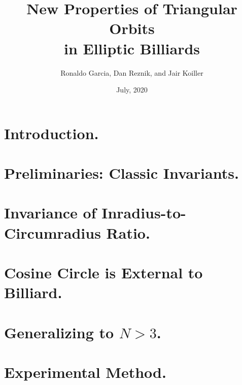\documentclass{article}
\begin{document}
\title{New Properties of Triangular Orbits\\in Elliptic Billiards}
\date{July, 2020}


 \author{Ronaldo Garcia, Dan Reznik, and Jair Koiller}

\maketitle



\section{Introduction.}
\label{sec:intro}


\section{Preliminaries: Classic Invariants.}
\label{sec:prelim}


\section{Invariance of Inradius-to-Circumradius Ratio.}
\label{sec:rovr}


\section{Cosine Circle is External to Billiard.}
\label{sec:cosine-circle}


%

\section{Generalizing to $N>3$.}
\label{sec:gener}


\section{Experimental Method.}
\label{sec:experimental}

\end{document}
